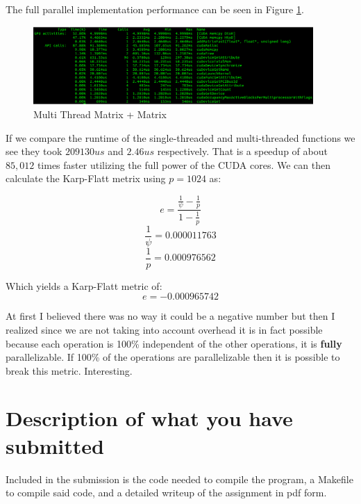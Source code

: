 \documentclass{article}
\begin{document}
The full parallel implementation performance can be seen in Figure \ref{fig:fastGrad}.

\begin{figure}[h]
    \centering
    \includegraphics[width=0.95\textwidth]{fastGrad}
    \caption{Multi Thread Matrix + Matrix}
    \label{fig:fastGrad}
\end{figure}

If we compare the runtime of the single-threaded and multi-threaded functions we 
see they took $209130us$ and $2.46us$ respectively. That is a speedup of about 
$85,012$ times faster utilizing the full power of the CUDA cores. We can then 
calculate the Karp-Flatt metrix using $p=1024$ as:

$$e = \frac{\frac{1}{\psi} - \frac{1}{p}}{1 - \frac{1}{p}}$$
$$\frac{1}{\psi} = 0.000011763$$
$$\frac{1}{p} = 0.000976562$$

Which yields a Karp-Flatt metric of:
$$e = -0.000965742$$

At first I believed there was no way it could be a negative number but then I 
realized since we are not taking into account overhead it is in fact possible 
because each operation is 100\% independent of the other operations, it is 
\textbf{fully} parallelizable. If 100\% of the operations are parallelizable 
then it is possible to break this metric. Interesting.


\section{Description of what you have submitted}
Included in the submission is the code needed to compile the program, a Makefile 
to compile said code, and a detailed writeup of the assignment in pdf form.
\end{document}
